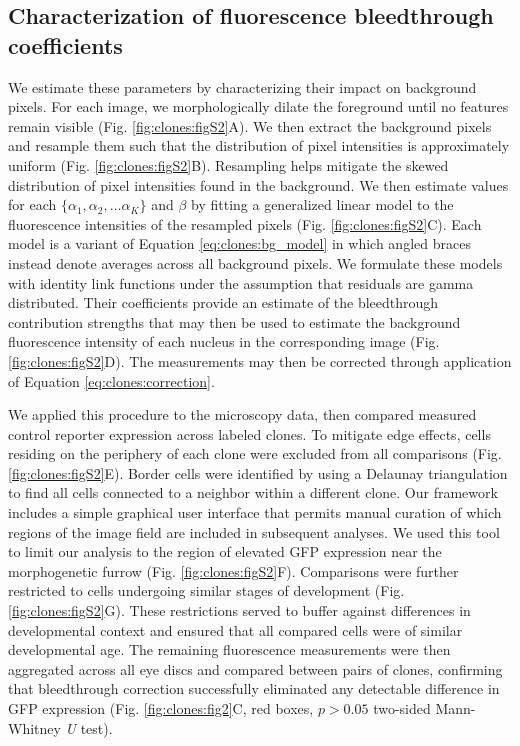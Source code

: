 \subsection{Characterization of fluorescence bleedthrough coefficients}
\label{ch:clones:model_fit}

We estimate these parameters by characterizing their impact on background pixels. For each image, we morphologically dilate the foreground until no features remain visible (Fig. \ref{fig:clones:figS2}A). We then extract the background pixels and resample them such that the distribution of pixel intensities is approximately uniform (Fig. \ref{fig:clones:figS2}B). Resampling helps mitigate the skewed distribution of pixel intensities found in the background. We then estimate values for each $\{\alpha_1, \alpha_2, \ldots \alpha_K\}$ and $\beta$ by fitting a generalized linear model to the fluorescence intensities of the resampled pixels (Fig. \ref{fig:clones:figS2}C). Each model is a variant of Equation \ref{eq:clones:bg_model} in which angled braces instead denote averages across all background pixels. We formulate these models with identity link functions under the assumption that residuals are gamma distributed. Their coefficients provide an estimate of the bleedthrough contribution strengths that may then be used to estimate the background fluorescence intensity of each nucleus in the corresponding image (Fig. \ref{fig:clones:figS2}D). The measurements may then be corrected through application of Equation \ref{eq:clones:correction}. 

We applied this procedure to the microscopy data, then compared measured control reporter expression across labeled clones. To mitigate edge effects, cells residing on the periphery of each clone were excluded from all comparisons (Fig. \ref{fig:clones:figS2}E). Border cells were identified by using a Delaunay triangulation to find all cells connected to a neighbor within a different clone. Our framework includes a simple graphical user interface that permits manual curation of which regions of the image field are included in subsequent analyses. We used this tool to limit our analysis to the region of elevated GFP expression near the morphogenetic furrow (Fig. \ref{fig:clones:figS2}F). Comparisons were further restricted to cells undergoing similar stages of development (Fig. \ref{fig:clones:figS2}G). These restrictions served to buffer against differences in developmental context and ensured that all compared cells were of similar developmental age. The remaining fluorescence measurements were then aggregated across all eye discs and compared between pairs of clones, confirming that bleedthrough correction successfully eliminated any detectable difference in GFP expression (Fig. \ref{fig:clones:fig2}C, red boxes, $p>0.05$ two-sided Mann-Whitney \textit{U} test).


